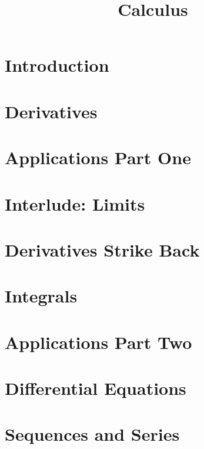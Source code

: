 \documentclass{article}
\title{Calculus}
\author{}
\date{}
\begin{document}
\maketitle

\section{Introduction}


\section{Derivatives}


\section{Applications Part One}


\section{Interlude: Limits}


\section{Derivatives Strike Back}


\section{Integrals}


\section{Applications Part Two}


\section{Differential Equations}


\section{Sequences and Series}
\end{document}
